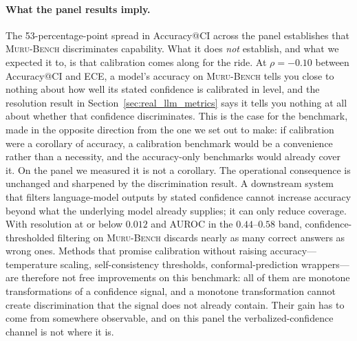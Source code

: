 \documentclass{article}
\newcommand{\muru}{\textsc{Muru-Bench}}
\begin{document}
\paragraph{What the panel results imply.}
The 53-percentage-point spread in Accuracy@CI across the panel establishes that \muru{} discriminates capability. What it does \emph{not} establish, and what we expected it to, is that calibration comes along for the ride. At $\rho = -0.10$ between Accuracy@CI and ECE, a model's accuracy on \muru{} tells you close to nothing about how well its stated confidence is calibrated in level, and the resolution result in Section~\ref{sec:real_llm_metrics} says it tells you nothing at all about whether that confidence discriminates. This is the case for the benchmark, made in the opposite direction from the one we set out to make: if calibration were a corollary of accuracy, a calibration benchmark would be a convenience rather than a necessity, and the accuracy-only benchmarks would already cover it. On the panel we measured it is not a corollary. The operational consequence is unchanged and sharpened by the discrimination result. A downstream system that filters language-model outputs by stated confidence cannot increase accuracy beyond what the underlying model already supplies; it can only reduce coverage. With resolution at or below $0.012$ and AUROC in the $0.44$--$0.58$ band, confidence-thresholded filtering on \muru{} discards nearly as many correct answers as wrong ones. Methods that promise calibration without raising accuracy---temperature scaling, self-consistency thresholds, conformal-prediction wrappers---are therefore not free improvements on this benchmark: all of them are monotone transformations of a confidence signal, and a monotone transformation cannot create discrimination that the signal does not already contain. Their gain has to come from somewhere observable, and on this panel the verbalized-confidence channel is not where it is.
\end{document}
